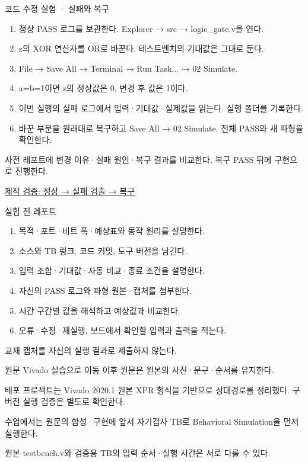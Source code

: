 \begin{frame}{코드 수정 실험 · 실패와 복구}\relax
\small
\begin{enumerate}\setlength{\itemsep}{0.22cm}
\item 정상 PASS 로그를 보관한다. Explorer → src → logic\_gate.v을 연다.
\item z의 XOR 연산자를 OR로 바꾼다. 테스트벤치의 기대값은 그대로 둔다.
\item File → Save All → Terminal → Run Task... → 02 Simulate.
\item a=b=1이면 z의 정상값은 0, 변경 후 값은 1이다.
\item 이번 실행의 실패 로그에서 입력·기대값·실제값을 읽는다. 실행 폴더를 기록한다.
\item 바꾼 부분을 원래대로 복구하고 Save All → 02 Simulate. 전체 PASS와 새 파형을 확인한다.
\end{enumerate}
사전 레포트에 변경 이유·실패 원인·복구 결과를 비교한다. 복구 PASS 뒤에 구현으로 진행한다.\par\href{https://github.com/Glaysia/ece2_26_2_2/blob/daily/0910/example/fpga_projects_hdl/LAB1/docs/student-modification-validation.json}{제작 검증: 정상 → 실패 검출 → 복구}
\end{frame}

\begin{frame}{실험 전 레포트}\relax
\small
\begin{enumerate}\setlength{\itemsep}{0.22cm}
\item 목적·포트·비트 폭·예상표와 동작 원리를 설명한다.
\item 소스와 TB 링크, 코드 커밋, 도구 버전을 남긴다.
\item 입력 조합·기대값·자동 비교·종료 조건을 설명한다.
\item 자신의 PASS 로그와 파형 원본·캡처를 첨부한다.
\item 시간 구간별 값을 해석하고 예상값과 비교한다.
\item 오류·수정·재실행, 보드에서 확인할 입력과 출력을 적는다.
\end{enumerate}
교재 캡처를 자신의 실행 결과로 제출하지 않는다.\par
\end{frame}

\begin{frame}[label=legacy-01-original-intro]{원문 Vivado 실습으로 이동}\relax
\small
이후 원문은 원본의 사진·문구·순서를 유지한다.\par\vspace{0.22cm}배포 프로젝트는 Vivado 2020.1 원본 XPR 형식을 기반으로 상대경로를 정리했다. 구버전 실행 검증은 별도로 확인한다.\par\vspace{0.22cm}수업에서는 원문의 합성·구현에 앞서 자기검사 TB로 Behavioral Simulation을 먼저 실행한다.\par\vspace{0.22cm}원본 testbench.v와 검증용 TB의 입력 순서·실행 시간은 서로 다를 수 있다.\par
\end{frame}

